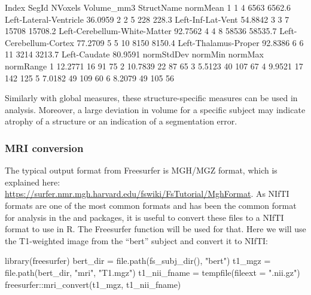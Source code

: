 \begin{Schunk}
\begin{Soutput}
  Index SegId NVoxels Volume_mm3                   StructName normMean
1     1     4    6563     6562.6       Left-Lateral-Ventricle  36.0959
2     2     5     228      228.3            Left-Inf-Lat-Vent  54.8842
3     3     7   15708    15708.2 Left-Cerebellum-White-Matter  92.7562
4     4     8   58536    58535.7       Left-Cerebellum-Cortex  77.2709
5     5    10    8150     8150.4         Left-Thalamus-Proper  92.8386
6     6    11    3214     3213.7                 Left-Caudate  80.9591
  normStdDev normMin normMax normRange
1    12.2771      16      91        75
2    10.7839      22      87        65
3     5.5123      40     107        67
4     9.9521      17     142       125
5     7.0182      49     109        60
6     8.2079      49     105        56
\end{Soutput}
\end{Schunk}

Similarly with global measures, these structure-specific measures can be
used in analysis. Moreover, a large deviation in volume for a specific
subject may indicate atrophy of a structure or an indication of a
segmentation error.

\subsubsection{MRI conversion}\label{mri-conversion}

The typical output format from Freesurfer is MGH/MGZ format, which is
explained here:
\url{https://surfer.nmr.mgh.harvard.edu/fswiki/FsTutorial/MghFormat}. As
NIfTI formats are one of the most common formats and has been the common
format for analysis in the  and  packages,
it is useful to convert these files to a NIfTI format to use in R. The
 Freesurfer function will be used for that. Here we
will use the T1-weighted image from the ``bert'' subject and convert it
to NIfTI:

\begin{Schunk}
\begin{Sinput}
library(freesurfer)
bert_dir = file.path(fs_subj_dir(), "bert")
t1_mgz = file.path(bert_dir, "mri", "T1.mgz")
t1_nii_fname = tempfile(fileext = ".nii.gz")
freesurfer::mri_convert(t1_mgz, t1_nii_fname)
\end{Sinput}
\end{Schunk}

